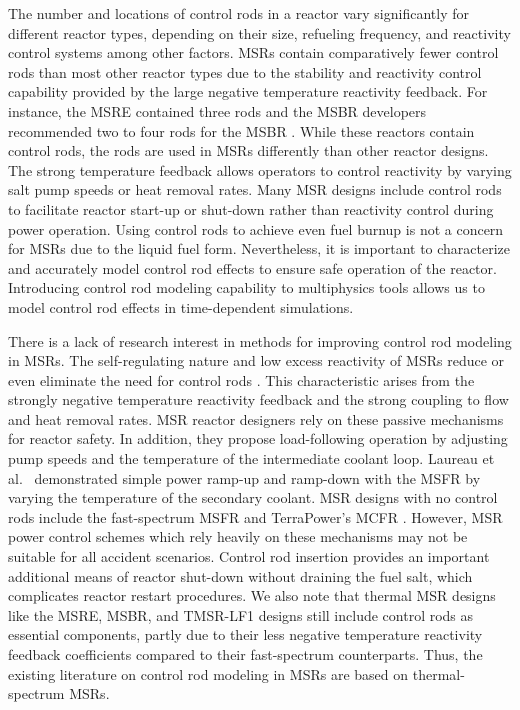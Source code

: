 The number and locations of control rods in a reactor vary significantly for different reactor
types, depending on their size, refueling frequency, and reactivity control systems among other
factors. \glspl{MSR} contain comparatively fewer control rods than most other reactor types due to
the stability and reactivity control capability provided by the large negative temperature
reactivity feedback. For instance, the \gls{MSRE} contained three rods and the \gls{MSBR}
developers recommended two to four rods for the \gls{MSBR} \cite{robertson_msre_1965,
robertson_conceptual_1971}. While these reactors contain control rods, the rods are used in
\glspl{MSR} differently than other reactor designs. The
strong temperature feedback allows operators to control reactivity by varying salt pump
speeds or heat removal rates. Many \gls{MSR} designs include control rods to facilitate reactor
start-up or shut-down rather than reactivity control during power operation. Using
control rods to achieve even fuel burnup is not a concern for \glspl{MSR} due to the liquid fuel
form. Nevertheless, it is important to characterize and accurately model control rod effects to
ensure safe operation of the reactor. Introducing control rod modeling capability to multiphysics
tools allows us to model control rod effects in time-dependent simulations.

There is a lack of research interest in methods for improving control rod modeling in
\glspl{MSR}.
The self-regulating nature and low excess reactivity of \glspl{MSR} reduce or even eliminate the
need for control rods \cite{dolan_1_2017}. This characteristic arises from the strongly negative
temperature reactivity feedback and the strong coupling to flow and heat removal rates. \gls{MSR}
reactor designers rely on these passive mechanisms for reactor safety. In addition, they propose
load-following operation by adjusting pump speeds and the temperature of the intermediate coolant
loop. Laureau et al.\ \cite{laureau_transient_2017} demonstrated simple power ramp-up and ramp-down
with the \gls{MSFR} by varying the temperature of the secondary coolant. \gls{MSR}
designs with no control rods include the fast-spectrum \gls{MSFR} and TerraPower's \gls{MCFR}
\cite{terrapower_terrapower_2021}. However, \gls{MSR} power control schemes which rely heavily on
these mechanisms may not be suitable for all accident scenarios. Control rod insertion provides
an important additional means of reactor shut-down without draining the fuel salt, which
complicates reactor restart procedures. We also note that thermal \gls{MSR} designs like the
\gls{MSRE}, \gls{MSBR}, and TMSR-LF1 designs still include control rods as essential components,
partly due to their less negative temperature reactivity feedback coefficients
compared to their fast-spectrum counterparts. Thus, the existing literature on control rod modeling
in \glspl{MSR} are based on thermal-spectrum \glspl{MSR}.

